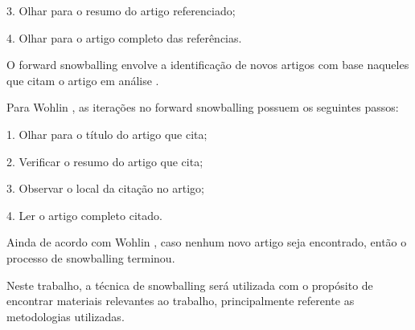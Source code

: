 3. Olhar para o resumo do artigo referenciado;

4. Olhar para o artigo completo das referências.

O forward snowballing envolve a identificação de novos artigos com base naqueles que citam o artigo em análise \cite{wohlin2014guidelines}.

Para Wohlin \cite{wohlin2014guidelines}, as iterações no forward snowballing possuem os seguintes passos:

1. Olhar para o título do artigo que cita;

2. Verificar o resumo do artigo que cita;

3. Observar o local da citação no artigo;

4. Ler o artigo completo citado.

Ainda de acordo com Wohlin \cite{wohlin2014guidelines}, caso nenhum novo artigo seja encontrado, então o processo de snowballing terminou.

Neste trabalho, a técnica de snowballing será utilizada com o propósito de encontrar materiais relevantes ao trabalho, principalmente referente as metodologias utilizadas.

